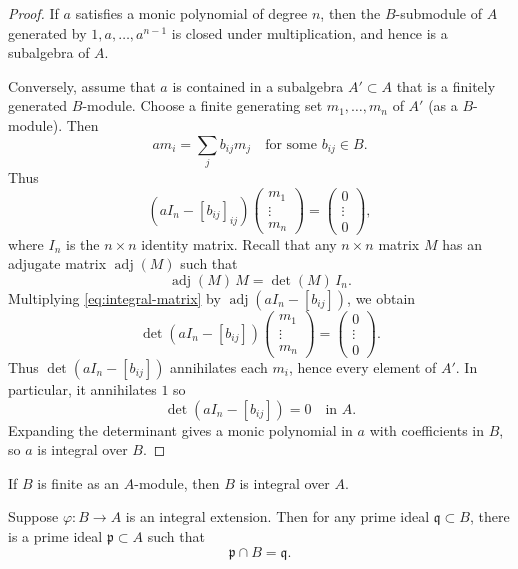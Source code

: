 \documentclass[12pt]{article}
\begin{document}
\begin{proof}
    If $a$ satisfies a monic polynomial of degree $n$, then the $B$-submodule of $A$ generated by $1,a,\dots,a^{n-1}$ is closed under multiplication, and hence is a subalgebra of $A$.

    Conversely, assume that $a$ is contained in a subalgebra $A' \subset A$ that is a finitely generated $B$-module. Choose a finite generating set $m_1,\dots,m_n$ of $A'$ (as a $B$-module). Then
    \[
        a m_i = \sum_j b_{ij} m_j
        \quad \text{for some } b_{ij} \in B.
    \]
    Thus
    \begin{equation}\label{eq:integral-matrix}
        \left(a I_n - [b_{ij}]_{ij}\right)
        \begin{pmatrix}
            m_1    \\
            \vdots \\
            m_n
        \end{pmatrix}
        =
        \begin{pmatrix}
            0      \\
            \vdots \\
            0
        \end{pmatrix},
    \end{equation}
    where $I_n$ is the $n \times n$ identity matrix. Recall that any $n \times n$ matrix $M$ has an adjugate matrix $\operatorname{adj}(M)$ such that
    \[
        \operatorname{adj}(M)\,M = \det(M)\,I_n.
    \]
    Multiplying \eqref{eq:integral-matrix} by $\operatorname{adj}(a I_n - [b_{ij}])$, we obtain
    \[
        \det(a I_n - [b_{ij}])
        \begin{pmatrix}
            m_1    \\
            \vdots \\
            m_n
        \end{pmatrix}
        =
        \begin{pmatrix}
            0      \\
            \vdots \\
            0
        \end{pmatrix}.
    \]
    Thus $\det(a I_n - [b_{ij}])$ annihilates each $m_i$, hence every element of $A'$.
    In particular, it annihilates $1$ so
    \[
        \det(a I_n - [b_{ij}]) = 0 \quad \text{in } A.
    \]
    Expanding the determinant gives a monic polynomial in $a$ with coefficients in $B$, so $a$ is integral over $B$.
\end{proof}
\begin{proposition}
    If $B$ is finite as an $A$-module, then $B$ is integral over $A$.
\end{proposition}
\begin{theorem}
    Suppose $\varphi : B \to A$ is an integral extension. Then for any prime ideal $\mathfrak q \subset B$, there is a prime ideal $\mathfrak p \subset A$ such that
    \[
        \mathfrak p \cap B = \mathfrak q.
    \]
\end{theorem}
\end{document}
